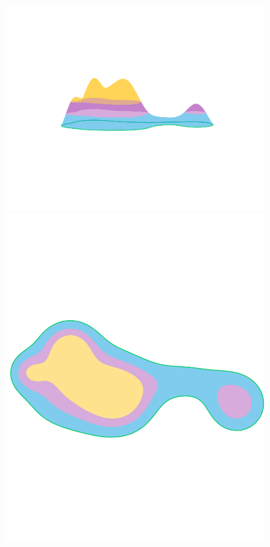 \begin{figure}[htbp]
  \includegraphics[trim=200 325 150 300, clip, scale=0.3]{scripts/figures/scalar_a2_A.png}
  \includegraphics[trim=0 350 0 370, clip, scale=0.2]{scripts/figures/scalar_a2_A_top.png}

\end{figure}
